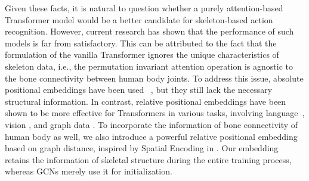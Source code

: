 \documentclass[10pt,twocolumn,letterpaper]{article}
\begin{document}
Given these facts, it is natural to question whether a purely attention-based Transformer model would be a better candidate for skeleton-based action recognition. However, current research \cite{plizzari2021spatial, shi2020decoupled} has shown that the performance of such models is far from satisfactory. This can be attributed to the fact that the formulation of the vanilla Transformer ignores the unique characteristics of skeleton data, i.e., 
the permutation invariant attention operation is agnostic to the bone connectivity between human body joints. To address this issue, absolute positional embeddings have been used~\cite{vaswani2017attention, dosovitskiy2021an, touvron2021training} , but they still lack the necessary structural information. In contrast, relative positional embeddings have been shown to be more effective for Transformers in various tasks, involving language~\cite{shaw2018self, dai2019transformer, he2020deberta}, vision \cite{liu2021swin, zhou2022sp, wu2021rethinking, zhou2022sp}, and graph data \cite{ying2021transformers}. To incorporate the information of bone connectivity of human body as well, we  also introduce a powerful relative positional embedding based on graph distance, inspired by Spatial Encoding in \cite{ying2021transformers}. Our embedding retains the information of skeletal structure during the entire training process, whereas GCNs merely use it for initialization. 
\end{document}
